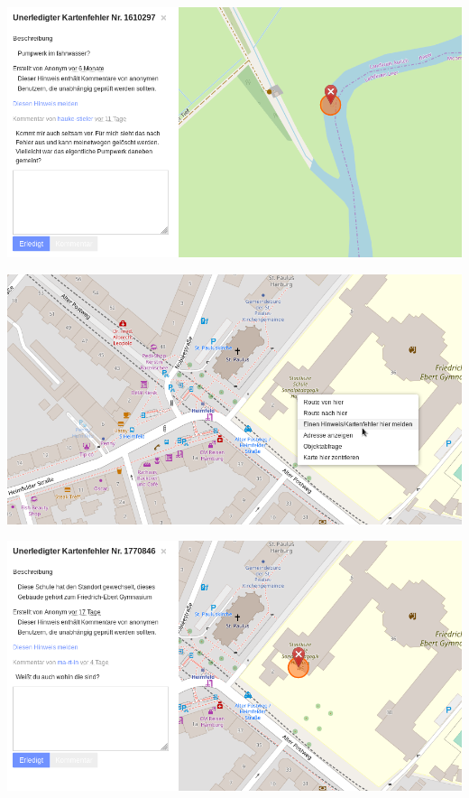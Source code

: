 \documentclass{beamer}
\begin{document}
	\begin{frame}
		\begin{center}
			\includegraphics[width=\linewidth,height=\textheight,keepaspectratio]{images/report-error}
		\end{center}
	\end{frame}

	\begin{frame}
		\begin{center}
			\includegraphics[width=\linewidth,height=\textheight,keepaspectratio]{images/report-error-2-menu}
		\end{center}
	\end{frame}
	
	\begin{frame}
		\begin{center}
			\includegraphics[width=\linewidth,height=\textheight,keepaspectratio]{images/report-error-2}
		\end{center}
	\end{frame}
	
\end{document}
